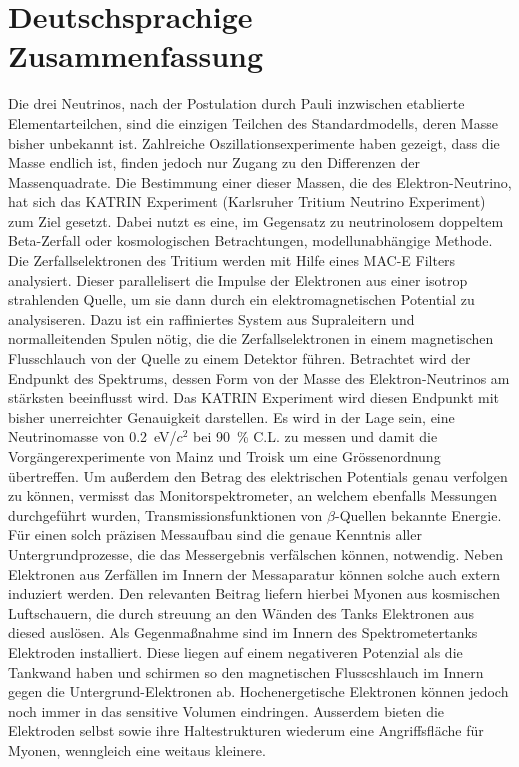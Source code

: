 \chapter*{Deutschsprachige Zusammenfassung}

Die drei Neutrinos, nach der Postulation durch Pauli inzwischen etablierte Elementarteilchen, sind die einzigen Teilchen des Standardmodells, deren Masse bisher unbekannt ist. Zahlreiche Oszillationsexperimente haben gezeigt, dass die Masse endlich ist, finden jedoch nur Zugang zu den Differenzen der Massenquadrate. Die Bestimmung einer dieser Massen, die des Elektron-Neutrino, hat sich das KATRIN Experiment ({Ka}rlsruher {Tri}tium {N}eutrino Experiment) zum Ziel gesetzt. Dabei nutzt es eine, im Gegensatz zu neutrinolosem doppeltem Beta-Zerfall oder kosmologischen Betrachtungen, modellunabh\"angige Methode. Die Zerfallselektronen des Tritium werden mit Hilfe eines MAC-E Filters analysiert. Dieser parallelisert die Impulse der Elektronen aus einer isotrop strahlenden Quelle, um sie dann durch ein elektromagnetischen Potential zu analysiseren. Dazu ist ein raffiniertes System aus Supraleitern und normalleitenden Spulen n\"otig, die die Zerfallselektronen in einem magnetischen Flusschlauch von der Quelle zu einem Detektor f\"uhren. Betrachtet wird der Endpunkt des Spektrums, dessen Form von der Masse des Elektron-Neutrinos am st\"arksten beeinflusst wird. Das KATRIN Experiment wird diesen Endpunkt mit bisher unerreichter Genauigkeit darstellen. Es wird in der Lage sein, eine Neutrinomasse von \SI{0.2}{\electronvolt}/$c^2$ bei \SI{90}{\percent} C.L. zu messen und damit die Vorg\"angerexperimente von Mainz und Troisk um eine Gr\"ossenordnung \"ubertreffen. Um au\ss erdem den Betrag des elektrischen Potentials genau verfolgen zu k\"onnen, vermisst das Monitorspektrometer, an welchem ebenfalls Messungen durchgef\"uhrt wurden, Transmissionsfunktionen von $\beta$-Quellen bekannte Energie. 
F\"ur einen solch pr\"azisen Messaufbau sind die genaue Kenntnis aller Untergrundprozesse, die das Messergebnis verf\"alschen k\"onnen, notwendig. Neben Elektronen aus Zerf\"allen im Innern der Messaparatur k\"onnen solche auch extern induziert werden. Den relevanten Beitrag liefern hierbei Myonen aus kosmischen Luftschauern, die durch streuung an den W\"anden des Tanks Elektronen aus diesed ausl\"osen. Als Gegenma\ss nahme sind im Innern des Spektrometertanks Elektroden installiert. Diese liegen auf einem negativeren Potenzial als die Tankwand haben und schirmen so den magnetischen Flusscshlauch im Innern gegen die Untergrund-Elektronen ab. Hochenergetische Elektronen k\"onnen jedoch noch immer in das sensitive Volumen eindringen. Ausserdem bieten die Elektroden selbst sowie ihre Haltestrukturen wiederum eine Angriffsfl\"ache f\"ur Myonen, wenngleich eine weitaus kleinere.\\

